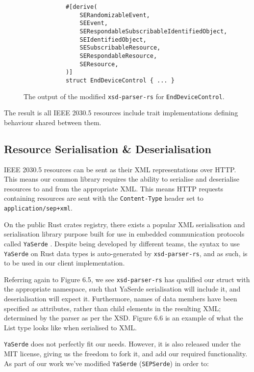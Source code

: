 \begin{figure}[H]
    \begin{center}
        \begin{lstlisting}
            #[derive(
                SERandomizableEvent,
                SEEvent,
                SERespondableSubscribableIdentifiedObject,
                SEIdentifiedObject,
                SESubscribableResource,
                SERespondableResource,
                SEResource,
            )]
            struct EndDeviceControl { ... }
        \end{lstlisting}
        \label{fig:edctraits}
        \caption{The output of the modified \texttt{xsd-parser-rs} for \texttt{EndDeviceControl}.}
    \end{center}
\end{figure}

The result is all IEEE 2030.5 resources include trait implementations defining behaviour shared between them. 

\subsection{Resource Serialisation \& Deserialisation}
IEEE 2030.5 resources can be sent as their XML representations over HTTP. This means our common library requires the ability to serialise and deserialise resources to and from the appropriate XML.
This means HTTP requests containing resources are sent with the \texttt{Content-Type} header set to \texttt{application/sep+xml}.

On the public Rust crates registry, there exists a popular XML serialisation and serialisation library purpose built for use in embedded communication protocols called \texttt{YaSerde} \cite[]{YaSerde}.
Despite being developed by different teams, the syntax to use \texttt{YaSerde} on Rust data types is auto-generated by \texttt{xsd-parser-rs}, and as such, is to be used in our client implementation.

Referring again to Figure 6.5, we see \texttt{xsd-parser-rs} has qualified our struct with the appropriate namespace, such that YaSerde serialisation will include it, and deserialisation will expect it.
Furthermore, names of data members have been specified as attributes, rather than child elements in the resulting XML; determined by the parser as per the XSD.
Figure 6.6 is an example of what the List type looks like when serialised to XML.

\texttt{YaSerde} does not perfectly fit our needs. However, it is also released under the MIT license, giving us the freedom to fork it, and add our required functionality.
As part of our work we've modified \texttt{YaSerde} (\texttt{SEPSerde}) in order to:

